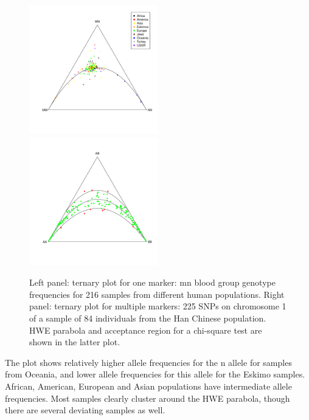 \documentclass[nojss]{jss}
\begin{document}
\begin{figure}[t!]
\centering
\includegraphics[width=0.5\textwidth, trim=0 60 0 20, clip]{MourantTP.pdf}%
\includegraphics[width=0.5\textwidth, trim=0 60 0 20, clip]{HapMapCHBChr1.pdf}
\caption{Left panel: ternary plot for one marker: {\sc mn} blood group
  genotype frequencies for 216 samples from different human
  populations. Right panel: ternary plot for multiple markers: 225
  SNPs on chromosome 1 of a sample of 84 individuals from the Han
  Chinese population. HWE parabola and acceptance region for a
  chi-square test are shown in the latter plot.}\label{fig:mourant}
\end{figure}
The plot shows relatively higher allele frequencies for the {\sc n}
allele for samples from Oceania, and lower allele frequencies for this
allele for the Eskimo samples. African, American, European and Asian
populations have intermediate allele frequencies. Most samples clearly
cluster around the HWE parabola, though there are
several deviating samples as well.
\end{document}
